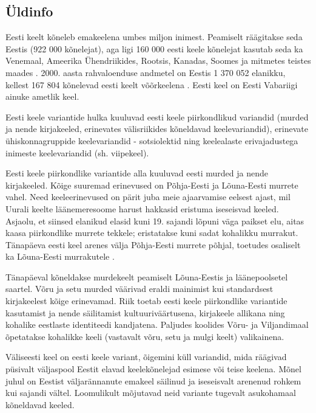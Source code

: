 \documentclass[]{../metanetpaper}
\begin{document}
\begin{multicols}{2}

\subsection{Üldinfo}

Eesti keelt kõneleb emakeelena umbes miljon inimest. 
Peamiselt räägitakse seda Eestis (922 000 kõnelejat), aga ligi 160 000 eesti keele kõnelejat kasutab seda ka Vene\-maal, Ameerika Ühendriikides, Rootsis, Kanadas, Soomes ja mitmetes teistes maades \cite{Stat1}. 
2000. aasta rahvaloenduse andmetel on Eestis 1 370 052 elanikku, kellest 167 804 kõnelevad eesti keelt võõrkeelena \cite{Stat2}. 
Eesti keel on Eesti Vabariigi ainuke ametlik keel.
 

Eesti keele variantide hulka kuuluvad eesti keele piirkondlikud variandid (murded ja nende kirjakeeled, erinevates välis\-riikides kõneldavad keelevariandid), erinevate ühiskonnagruppide keelevariandid - sotsiolektid ning keelealaste erivajadustega inimeste keelevariandid (sh. viipekeel).

Eesti keele piirkondlike variantide alla kuuluvad eesti murded ja nende kirjakeeled. 
Kõige suuremad erinevused on Põhja-Eesti ja Lõuna-Eesti murrete vahel.
Need keeleerinevused on pärit juba meie ajaarvamise eelsest ajast, mil Uurali keelte läänemeresoome harust hakkasid eristuma iseseisvad keeled.
Asja\-olu, et siinsed elanikud elasid kuni 19. sajandi lõpuni väga paikset elu, aitas kaasa piirkondlike murrete tekkele; eristatakse kuni sadat kohalikku murrakut.
Tänapäeva eesti keel arenes välja Põhja-Eesti murrete põhjal, toetudes osaliselt ka Lõuna-Eesti murrakutele \cite{KeeleStratEst}.

Tänapäeval kõneldakse murdekeelt peamiselt Lõuna-Eestis ja läänepoolsetel saartel. 
Võru ja setu murded väärivad eraldi mainimist kui standardsest kirjakeelest kõige eri\-nevamad. 
Riik toetab eesti keele piirkondlike variantide kasutamist ja nende säilitamist kultuuriväärtusena, kirjakeele allikana ning kohalike eestlaste identiteedi kandjatena. 
Paljudes koolides Võru- ja Viljandimaal õpetatakse kohalikke keeli (vastavalt võru, setu ja mulgi keelt) valikainena.

Väliseesti keel on eesti keele variant, õigemini küll variandid, mida räägivad püsivalt väljaspool Eestit elavad keelekõnelejad esimese või teise keelena. 
Mõnel juhul on Eestist väljarännanute emakeel säilinud ja iseseisvalt arenenud rohkem kui sajandi vältel.
Loomulikult mõjutavad neid variante tugevalt asukohamaal kõneldavad keeled. 


\end{multicols}
\end{document}
